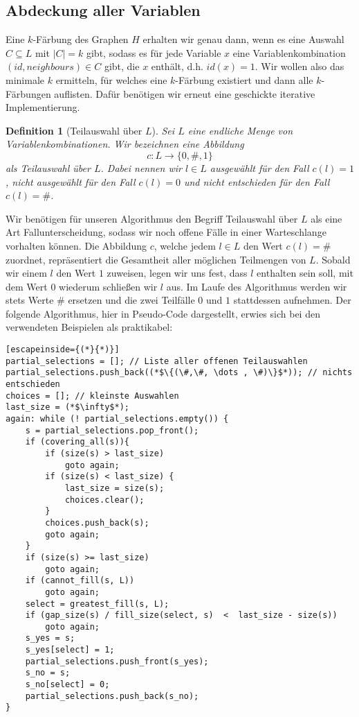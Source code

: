 \documentclass[a4paper]{article}
\newtheorem{definition}[satz]{Definition} %
\theoremstyle{nonumberplain}
\begin{document}
\subsection{Abdeckung aller Variablen}

Eine $k$-Färbung des Graphen $H$ erhalten wir genau dann, wenn es eine Auswahl $C \subseteq L$ mit $|C| = k$ gibt, sodass es für jede Variable $x$ eine Variablenkombination $(id, neighbours) \in C$ gibt, die $x$ enthält, d.h. $id(x) = 1$. Wir wollen also das minimale $k$ ermitteln, für welches eine $k$-Färbung existiert und dann alle $k$-Färbungen auflisten. Dafür benötigen wir erneut eine geschickte iterative Implementierung.

\begin{definition}[Teilauswahl über $L$]
	Sei $L$ %
	eine endliche Menge von Variablenkombinationen. Wir bezeichnen eine Abbildung
	\begin{equation*}
		c : L \to \{0, \#, 1\}
	\end{equation*}
	als \emph{Teilauswahl über} $L$. Dabei nennen wir $l \in L$ \textit{ausgewählt} für den Fall $c(l) = 1$, \textit{nicht ausgewählt} für den Fall $c(l) = 0$ und \textit{nicht entschieden} für den Fall $c(l) = \#$.
\end{definition}

Wir benötigen für unseren Algorithmus den Begriff Teilauswahl über $L$ als eine Art Fallunterscheidung, sodass wir noch offene Fälle in einer Warteschlange vorhalten können. Die Abbildung $c$, welche jedem $l \in L$ den Wert $c(l) = \#$ zuordnet, repräsentiert die Gesamtheit aller möglichen Teilmengen von $L$. Sobald wir einem $l$ den Wert $1$ zuweisen, legen wir uns fest, dass $l$ enthalten sein soll, mit dem Wert $0$ wiederum schließen wir $l$ aus. Im Laufe des Algorithmus werden wir stets Werte $\#$ ersetzen und die zwei Teilfälle $0$ und $1$ stattdessen aufnehmen.
Der folgende Algorithmus, hier in Pseudo-Code dargestellt, erwies sich bei den verwendeten Beispielen als praktikabel:
{
\small
\begin{lstlisting}[escapeinside={(*}{*)}]
partial_selections = []; // Liste aller offenen Teilauswahlen
partial_selections.push_back((*$\{(\#,\#, \dots , \#)\}$*)); // nichts entschieden
choices = []; // kleinste Auswahlen
last_size = (*$\infty$*);
again: while (! partial_selections.empty()) {
	s = partial_selections.pop_front();
	if (covering_all(s)){
		if (size(s) > last_size)
			goto again;
		if (size(s) < last_size) {
			last_size = size(s);
			choices.clear();
		}
		choices.push_back(s);
		goto again;
	}
	if (size(s) >= last_size)
		goto again;
	if (cannot_fill(s, L))
		goto again;
	select = greatest_fill(s, L);
	if (gap_size(s) / fill_size(select, s)  <  last_size - size(s))
		goto again;
	s_yes = s;
	s_yes[select] = 1;
	partial_selections.push_front(s_yes);
	s_no = s;
	s_no[select] = 0;
	partial_selections.push_back(s_no);
}
\end{lstlisting}
}
\end{document}
